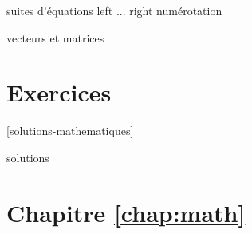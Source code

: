 suites d'équations
  left ... right
  numérotation

vecteurs et matrices


\section{Exercices}
\label{sec:math:exercices}

[solutions-mathematiques]

\begin{Filesave}{solutions}
\section*{Chapitre \ref*{chap:math}}

\end{Filesave}




